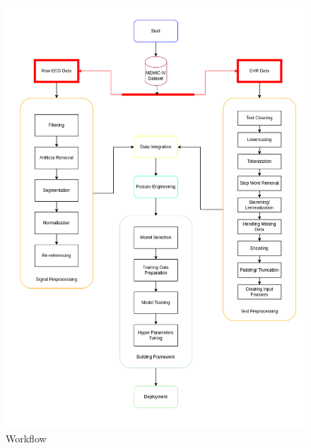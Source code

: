 \begin{figure}[ht]
\centering
\includegraphics[scale=0.5]{images/workplan.png}
\caption{Workflow}
\label{fig:x Workflow}
\end{figure}